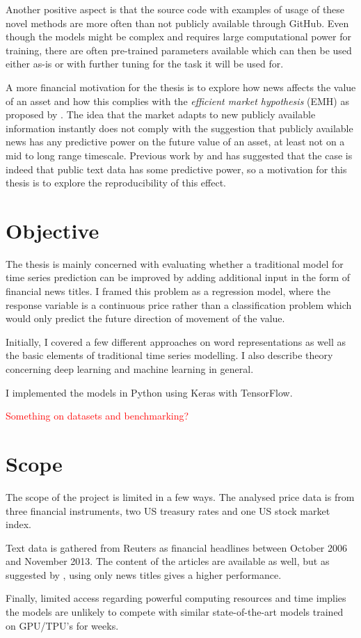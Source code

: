 Another positive aspect is that the source code with examples of usage of these novel methods are more often than not publicly available through GitHub. Even though the models might be complex and requires large computational power for training, there are often pre-trained parameters available which can then be used either as-is or with further tuning for the task it will be used for. 

A more financial motivation for the thesis is to explore how news affects the value of an asset and how this complies with the \emph{efficient market hypothesis} (EMH) as proposed by \citet{malkiel1970efficient}. The idea that the market adapts to new publicly available information instantly does not comply with the suggestion that publicly available news has any predictive power on the future value of an asset, at least not on a mid to long range timescale. Previous work by  \citet{xing} and \citet{arorausing} has suggested that the case is indeed that public text data has some predictive power, so a motivation for this thesis is to explore the reproducibility of this effect.

\section{Objective}

The thesis is mainly concerned with evaluating whether a traditional model for time series prediction can be improved by adding additional input in the form of financial news titles. I framed this problem as a regression model, where the response variable is a continuous price rather than a classification problem which would only predict the future direction of movement of the value. 

Initially, I covered a few different approaches on word representations as well as the basic elements of traditional time series modelling. I also describe theory concerning deep learning and machine learning in general. 

I implemented the models in Python using Keras with TensorFlow. 

\textcolor{red}{Something on datasets and benchmarking?}

\section{Scope}

The scope of the project is limited in a few ways. The analysed price data is from three financial instruments, two US treasury rates and one US stock market index. 

Text data is gathered from Reuters as financial headlines between October 2006 and November 2013. The content of the articles are available as well, but as suggested by \citet{ding2014using}, using only news titles gives a higher performance. 

Finally, limited access regarding powerful computing resources and time implies the models are unlikely to compete with similar state-of-the-art models trained on GPU/TPU's for weeks. 










